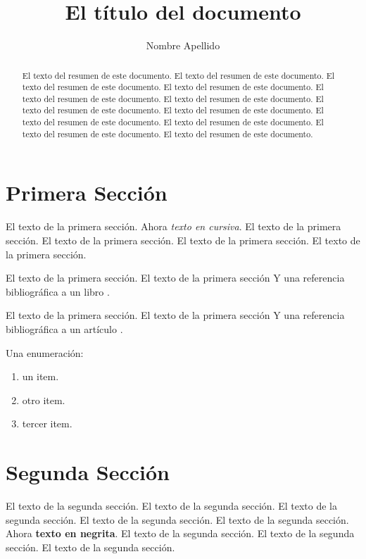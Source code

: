\documentclass{llncs}
\title{El título del documento}
\author { Nombre Apellido \inst{1} }
\institute{
           Departamento \\
           Universidad \\
           Direcc. \\
           e-mail: {\tt email@dominio.com}
}
\date{}
\begin{document}
\maketitle


\begin{abstract}

El texto del resumen de este documento. El texto del resumen de este documento. El texto del resumen de este documento. El texto del resumen de este documento. El texto del resumen de este documento. El texto del resumen de este documento. El texto del resumen de este documento. El texto del resumen de este documento. El texto del resumen de este documento. El texto del resumen de este documento. El texto del resumen de este documento. El texto del resumen de este documento. 

\end{abstract}



\section{Primera Sección}
\label{sec:uno}

El texto de la primera sección. Ahora \emph{texto en cursiva}. El texto de la primera sección. El texto de la primera sección. El texto de la primera sección. El texto de la primera sección. 

El texto de la primera sección. El texto de la primera sección Y una referencia bibliográfica a un libro \cite{Rumelhart}.

El texto de la primera sección. El texto de la primera sección Y una referencia bibliográfica a un artículo \cite{heli1}.

Una enumeración:

\begin{enumerate}
	\item un item.
	\item otro item.
	\item tercer item.
\end{enumerate}


\section{Segunda Sección}
\label{sec:dos}

El texto de la segunda sección. El texto de la segunda sección. El texto de la segunda sección. El texto de la segunda sección. El texto de la segunda sección. Ahora \textbf{texto en negrita}. El texto de la segunda sección. El texto de la segunda sección. El texto de la segunda sección. 
\end{document}
